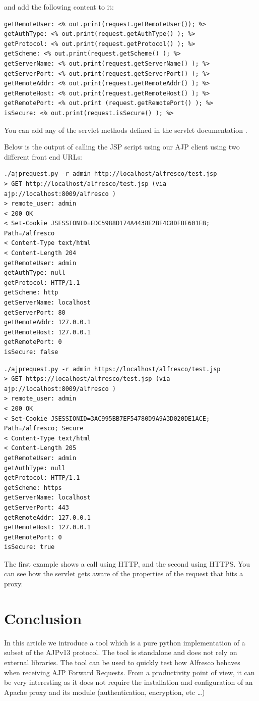 \documentclass[12pt,a4]{article}
\begin{document}
and add the following content to it:


\begin{verbatim}
getRemoteUser: <% out.print(request.getRemoteUser()); %>
getAuthType: <% out.print(request.getAuthType() ); %>
getProtocol: <% out.print(request.getProtocol() ); %>
getScheme: <% out.print(request.getScheme() ); %>
getServerName: <% out.print(request.getServerName() ); %>
getServerPort: <% out.print(request.getServerPort() ); %>
getRemoteAddr: <% out.print(request.getRemoteAddr() ); %>
getRemoteHost: <% out.print(request.getRemoteHost() ); %>
getRemotePort: <% out.print (request.getRemotePort() ); %>
isSecure: <% out.print(request.isSecure() ); %>
\end{verbatim}

You can add any of the servlet methods defined in the servlet documentation\cite{httpservlet} \cite{servlet}.

Below is the output of calling the JSP script using our AJP client using two different front end URLs:

\begin{verbatim}
./ajprequest.py -r admin http://localhost/alfresco/test.jsp
> GET http://localhost/alfresco/test.jsp (via ajp://localhost:8009/alfresco )
> remote_user: admin
< 200 OK
< Set-Cookie JSESSIONID=EDC5988D174A4438E2BF4C8DFBE601EB; Path=/alfresco
< Content-Type text/html
< Content-Length 204
getRemoteUser: admin
getAuthType: null
getProtocol: HTTP/1.1
getScheme: http
getServerName: localhost
getServerPort: 80
getRemoteAddr: 127.0.0.1
getRemoteHost: 127.0.0.1
getRemotePort: 0
isSecure: false
\end{verbatim}

\begin{verbatim}
./ajprequest.py -r admin https://localhost/alfresco/test.jsp
> GET https://localhost/alfresco/test.jsp (via ajp://localhost:8009/alfresco )
> remote_user: admin
< 200 OK
< Set-Cookie JSESSIONID=3AC995BB7EF54780D9A9A3D020DE1ACE; Path=/alfresco; Secure
< Content-Type text/html
< Content-Length 205
getRemoteUser: admin
getAuthType: null
getProtocol: HTTP/1.1
getScheme: https
getServerName: localhost
getServerPort: 443
getRemoteAddr: 127.0.0.1
getRemoteHost: 127.0.0.1
getRemotePort: 0
isSecure: true
\end{verbatim}

The first example shows a call using HTTP, and the second using HTTPS. You can see how the servlet gets aware of the properties of the request that hits a proxy.


\section{Conclusion}
In this article we introduce a tool which is a pure python implementation of a subset of the AJPv13 protocol.
The tool is standalone and does not rely on external libraries. The tool can be used to quickly test how Alfresco behaves when receiving AJP Forward Requests. From a productivity point of view, it can be very interesting as it does not require the installation and configuration of an Apache proxy and its module (authentication, encryption, etc \dots)
\end{document}
